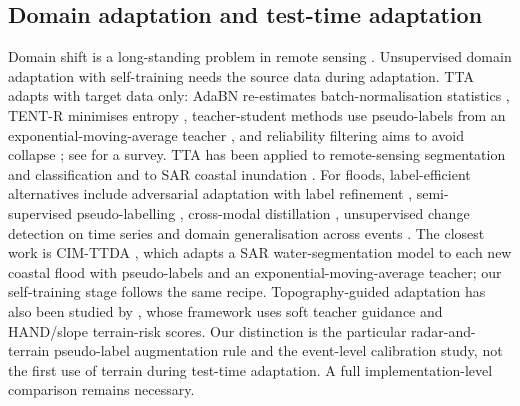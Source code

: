\documentclass[a4paper,fleqn]{cas-sc}
\begin{document}
\subsection{Domain adaptation and test-time adaptation}
Domain shift is a long-standing problem in remote sensing \citep{tuia2016darsreview}. Unsupervised domain adaptation with self-training \citep{lee2013pseudolabel,zou2018cbst,hoyer2022daformer} needs the source data during adaptation. TTA adapts with target data only: AdaBN re-estimates batch-normalisation statistics \citep{li2018adabn,schneider2020covariate}, TENT-R minimises entropy \citep{wang2021tent}, teacher-student methods use pseudo-labels from an exponential-moving-average teacher \citep{tarvainen2017meanteacher,wang2022cotta}, and reliability filtering aims to avoid collapse \citep{niu2022eata,niu2023sar}; see \citet{liang2025ttasurvey} for a survey. TTA has been applied to remote-sensing segmentation and classification \citep{wang2024rsselfprompt,liang2024lscdtta} and to SAR coastal inundation \citep{chen2026cimttda}. For floods, label-efficient alternatives include adversarial adaptation with label refinement \citep{akiva2021h2onet}, semi-supervised pseudo-labelling \citep{paul2021semisup}, cross-modal distillation \citep{garg2023crossmodal}, unsupervised change detection on time series \citep{yadav2022unsupts} and domain generalisation across events \citep{turkmenli2025dgflood}. The closest work is CIM-TTDA \citep{chen2026cimttda}, which adapts a SAR water-segmentation model to each new coastal flood with pseudo-labels and an exponential-moving-average teacher; our self-training stage follows the same recipe. Topography-guided adaptation has also been studied by \citet{song2026tgtta}, whose framework uses soft teacher guidance and HAND/slope terrain-risk scores. Our distinction is the particular radar-and-terrain pseudo-label augmentation rule and the event-level calibration study, not the first use of terrain during test-time adaptation. A full implementation-level comparison remains necessary.
\end{document}
